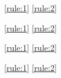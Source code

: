 \documentclass{article}
\begin{document}
\begin{verbatim*}
\begin{mathpar}
\label{rule:7}


\label{rule:8}

\end{mathpar}
\end{verbatim*}

\begin{mathpar}
  \label{rule:7}


  \label{rule:8}

\end{mathpar}

\begin{verbatim*}
\ref{rule:1}
\ref{rule:2}
\end{verbatim*}
%
\ref{rule:1}
\ref{rule:2}

\begin{verbatim*}
\cref{rule:1}
\cref{rule:2}
\end{verbatim*}
%
\cref{rule:1}
\cref{rule:2}
\end{document}
